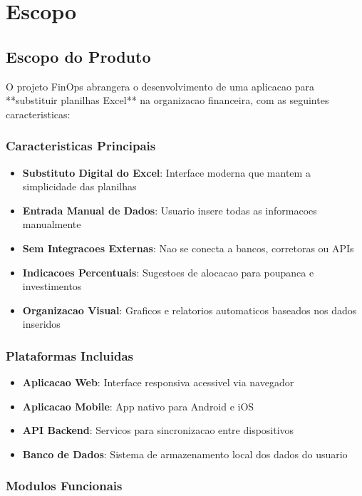 \section{Escopo}

\subsection{Escopo do Produto}

O projeto FinOps abrangera o desenvolvimento de uma aplicacao para **substituir planilhas Excel** na organizacao financeira, com as seguintes caracteristicas:

\subsubsection{Caracteristicas Principais}
\begin{itemize}
    \item \textbf{Substituto Digital do Excel}: Interface moderna que mantem a simplicidade das planilhas
    \item \textbf{Entrada Manual de Dados}: Usuario insere todas as informacoes manualmente 
    \item \textbf{Sem Integracoes Externas}: Nao se conecta a bancos, corretoras ou APIs
    \item \textbf{Indicacoes Percentuais}: Sugestoes de alocacao para poupanca e investimentos
    \item \textbf{Organizacao Visual}: Graficos e relatorios automaticos baseados nos dados inseridos
\end{itemize}

\subsubsection{Plataformas Incluidas}
\begin{itemize}
    \item \textbf{Aplicacao Web}: Interface responsiva acessivel via navegador
    \item \textbf{Aplicacao Mobile}: App nativo para Android e iOS  
    \item \textbf{API Backend}: Servicos para sincronizacao entre dispositivos
    \item \textbf{Banco de Dados}: Sistema de armazenamento local dos dados do usuario
\end{itemize}

\subsubsection{Modulos Funcionais}


